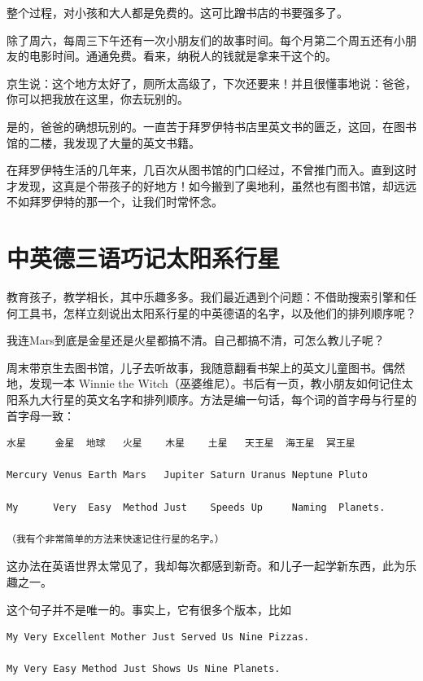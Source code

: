 \documentclass[twoside,openright,headings=optiontohead]{ctexbook} %
\begin{document}
{整个过程，对小孩和大人都是免费的。这可比蹭书店的书要强多了。

除了周六，每周三下午还有一次小朋友们的故事时间。每个月第二个周五还有小朋友的电影时间。通通免费。看来，纳税人的钱就是拿来干这个的。

京生说：这个地方太好了，厕所太高级了，下次还要来！并且很懂事地说：爸爸，你可以把我放在这里，你去玩别的。

是的，爸爸的确想玩别的。一直苦于拜罗伊特书店里英文书的匮乏，这回，在图书馆的二楼，我发现了大量的英文书籍。

在拜罗伊特生活的几年来，几百次从图书馆的门口经过，不曾推门而入。直到这时才发现，这真是个带孩子的好地方！如今搬到了奥地利，虽然也有图书馆，却远远不如拜罗伊特的那一个，让我们时常怀念。

\chapter*{中英德三语巧记太阳系行星}\label{planets-names}

教育孩子，教学相长，其中乐趣多多。我们最近遇到个问题：不借助搜索引擎和任何工具书，怎样立刻说出太阳系行星的中英德语的名字，以及他们的排列顺序呢？

我连Mars到底是金星还是火星都搞不清。自己都搞不清，可怎么教儿子呢？

周末带京生去图书馆，儿子去听故事，我随意翻看书架上的英文儿童图书。偶然地，发现一本
Winnie the
Witch（巫婆维尼）。书后有一页，教小朋友如何记住太阳系九大行星的英文名字和排列顺序。方法是编一句话，每个词的首字母与行星的首字母一致：

\begin{verbatim}
水星     金星  地球   火星    木星    土星   天王星  海王星  冥王星

Mercury Venus Earth Mars   Jupiter Saturn Uranus Neptune Pluto

My      Very  Easy  Method Just    Speeds Up     Naming  Planets.

（我有个非常简单的方法来快速记住行星的名字。）
\end{verbatim}

这办法在英语世界太常见了，我却每次都感到新奇。和儿子一起学新东西，此为乐趣之一。

这个句子并不是唯一的。事实上，它有很多个版本，比如

\begin{verbatim}
My Very Excellent Mother Just Served Us Nine Pizzas.

My Very Easy Method Just Shows Us Nine Planets.


\end{verbatim}}
\end{document}
